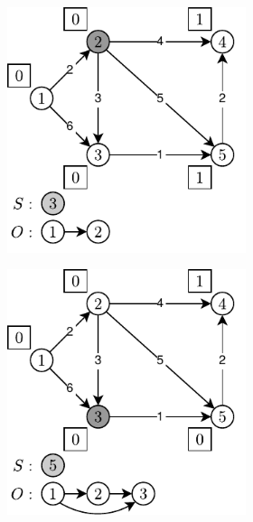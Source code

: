 \begin{figure}[!htbp]
\begin{subfigure}[b]{\textwidth}
\begin{subfigure}[b]{0.3\textwidth}
			\caption{}
			\label{fig:exampleKhan:b}
		\end{subfigure}
		\hfill
		\begin{subfigure}[b]{0.3\textwidth}
			\includegraphics[width=\textwidth]{Chapter_II/KHAN-TOPOLOGICAL-SORT-Example/c.pdf}
			\caption{}
			\label{fig:exampleKhan:c}
		\end{subfigure}
		\hfill\null
	\end{subfigure}
	\begin{subfigure}[b]{\textwidth}
			\null\hfill
		\begin{subfigure}[b]{0.3\textwidth}
			\includegraphics[width=\textwidth]{Chapter_II/KHAN-TOPOLOGICAL-SORT-Example/d.pdf}

\end{subfigure}
\end{subfigure}
\end{figure}
